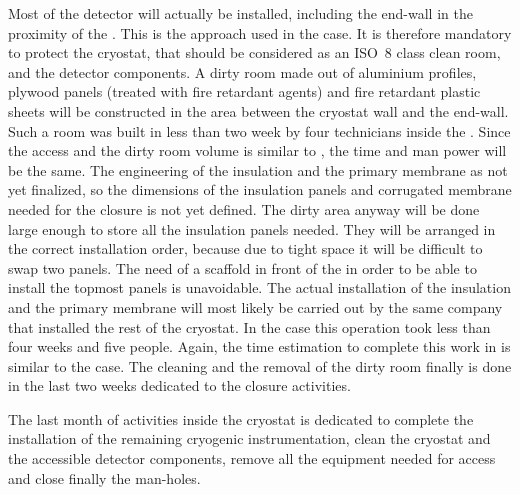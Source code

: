 Most of the detector will actually be installed, including the  end-wall in the proximity of the .
This is the approach used in the  case.
It is therefore mandatory to protect the cryostat, that should be considered as an ISO~8 class clean room, and the detector components.
A dirty room made out of aluminium profiles, plywood panels (treated with fire retardant agents) and fire retardant plastic sheets will be constructed in the area between the cryostat wall and the  end-wall.
Such a room was built in less than two week by four technicians inside the .
Since the access and the dirty room volume is similar to , the time and man power will be the same.
The engineering of the insulation and the primary membrane as not yet finalized, so the dimensions of the insulation panels and corrugated membrane needed for the  closure is not yet defined.
The dirty area anyway will be done large enough to store all the insulation panels needed.
They will be arranged in the correct installation order, because due to tight space it will be difficult to swap two panels.
The need of a scaffold in front of the  in order to be able to install the topmost panels is unavoidable.
The actual installation of the insulation and the primary membrane will most likely be carried out by the same company that installed the rest of the cryostat.
In the  case this operation took less than four weeks and five people.
Again, the time estimation to complete this work in  is similar to the  case.
The cleaning and the removal of the dirty room finally is done in the last two weeks dedicated to the  closure activities.

The last month of activities inside the cryostat is dedicated to complete the installation of the remaining cryogenic instrumentation, clean the cryostat and the accessible detector components, remove all the equipment needed for access and close finally the man-holes.

